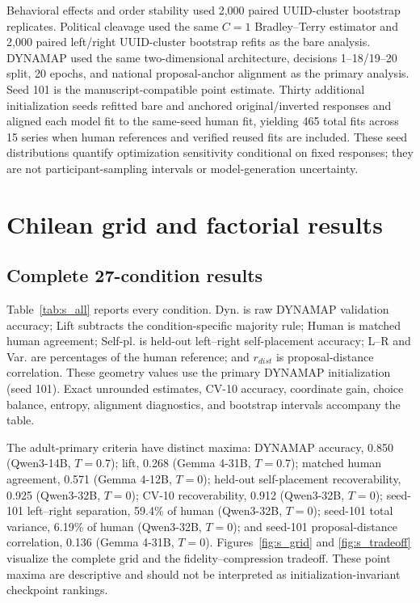 \documentclass[unnumsec,webpdf,modern,large]{oup-authoring-template}
\begin{document}
Behavioral effects and order stability used 2,000 paired UUID-cluster bootstrap replicates. Political cleavage used the same $C=1$ Bradley--Terry estimator and 2,000 paired left/right UUID-cluster bootstrap refits as the bare analysis. DYNAMAP used the same two-dimensional architecture, decisions 1--18/19--20 split, 20 epochs, and national proposal-anchor alignment as the primary analysis. Seed 101 is the manuscript-compatible point estimate. Thirty additional initialization seeds refitted bare and anchored original/inverted responses and aligned each model fit to the same-seed human fit, yielding 465 total fits across 15 series when human references and verified reused fits are included. These seed distributions quantify optimization sensitivity conditional on fixed responses; they are not participant-sampling intervals or model-generation uncertainty.

\section{Chilean grid and factorial results}

\subsection{Complete 27-condition results}

Table~\ref{tab:s_all} reports every condition. Dyn. is raw DYNAMAP validation accuracy; Lift subtracts the condition-specific majority rule; Human is matched human agreement; Self-pl. is held-out left--right self-placement accuracy; L--R and Var. are percentages of the human reference; and $r_{dist}$ is proposal-distance correlation. These geometry values use the primary DYNAMAP initialization (seed 101). Exact unrounded estimates, CV-10 accuracy, coordinate gain, choice balance, entropy, alignment diagnostics, and bootstrap intervals accompany the table.

\begin{table}[!t]
\caption{Complete model grid.}
\label{tab:s_all}
\centering
\scriptsize
\resizebox{\textwidth}{!}{}
\end{table}

The adult-primary criteria have distinct maxima: DYNAMAP accuracy, 0.850 (Qwen3-14B, $T=0.7$); lift, 0.268 (Gemma 4-31B, $T=0.7$); matched human agreement, 0.571 (Gemma 4-12B, $T=0$); held-out self-placement recoverability, 0.925 (Qwen3-32B, $T=0$); CV-10 recoverability, 0.912 (Qwen3-32B, $T=0$); seed-101 left--right separation, 59.4\% of human (Qwen3-32B, $T=0$); seed-101 total variance, 6.19\% of human (Qwen3-32B, $T=0$); and seed-101 proposal-distance correlation, 0.136 (Gemma 4-31B, $T=0$). Figures~\ref{fig:s_grid} and \ref{fig:s_tradeoff} visualize the complete grid and the fidelity--compression tradeoff. These point maxima are descriptive and should not be interpreted as initialization-invariant checkpoint rankings.
\end{document}
